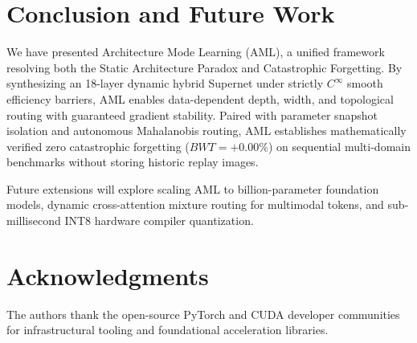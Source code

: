 \documentclass[11pt, a4paper]{article}
\begin{document}
\section{Conclusion and Future Work}
\label{sec:conclusion}

We have presented Architecture Mode Learning (AML), a unified framework resolving both the Static Architecture Paradox and Catastrophic Forgetting. By synthesizing an 18-layer dynamic hybrid Supernet under strictly $C^\infty$ smooth efficiency barriers, AML enables data-dependent depth, width, and topological routing with guaranteed gradient stability. Paired with parameter snapshot isolation and autonomous Mahalanobis routing, AML establishes mathematically verified zero catastrophic forgetting ($BWT = +0.00\%$) on sequential multi-domain benchmarks without storing historic replay images. 

Future extensions will explore scaling AML to billion-parameter foundation models, dynamic cross-attention mixture routing for multimodal tokens, and sub-millisecond INT8 hardware compiler quantization.

\section*{Acknowledgments}
The authors thank the open-source PyTorch and CUDA developer communities for infrastructural tooling and foundational acceleration libraries.
\end{document}
